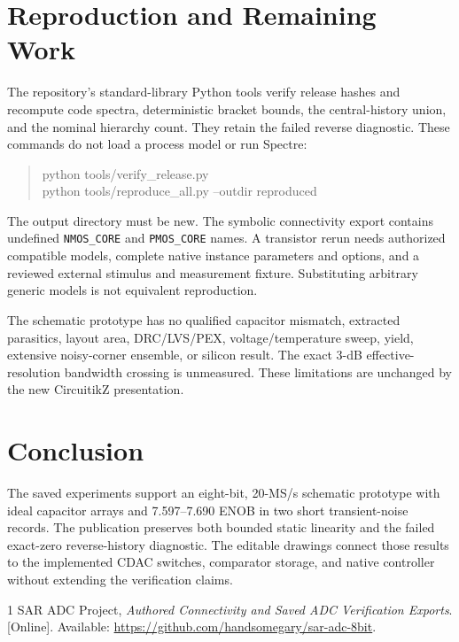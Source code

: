 \documentclass[10pt,conference,letterpaper]{IEEEtran}
\begin{document}
\section{Reproduction and Remaining Work}
The repository's standard-library Python tools verify release hashes and recompute code spectra, deterministic bracket bounds, the central-history union, and the nominal hierarchy count. They retain the failed reverse diagnostic. These commands do not load a process model or run Spectre:
\begin{quote}\small\ttfamily
python tools/verify\_release.py\\
python tools/reproduce\_all.py --outdir reproduced
\end{quote}
The output directory must be new. The symbolic connectivity export contains undefined \texttt{NMOS\_CORE} and \texttt{PMOS\_CORE} names. A transistor rerun needs authorized compatible models, complete native instance parameters and options, and a reviewed external stimulus and measurement fixture. Substituting arbitrary generic models is not equivalent reproduction.

The schematic prototype has no qualified capacitor mismatch, extracted parasitics, layout area, DRC/LVS/PEX, voltage/temperature sweep, yield, extensive noisy-corner ensemble, or silicon result. The exact 3-dB effective-resolution bandwidth crossing is unmeasured. These limitations are unchanged by the new CircuitikZ presentation.

\section{Conclusion}
The saved experiments support an eight-bit, 20-MS/s schematic prototype with ideal capacitor arrays and 7.597--7.690 ENOB in two short transient-noise records. The publication preserves both bounded static linearity and the failed exact-zero reverse-history diagnostic. The editable drawings connect those results to the implemented CDAC switches, comparator storage, and native controller without extending the verification claims.

\begin{thebibliography}{1}
 SAR ADC Project, \emph{Authored Connectivity and Saved ADC Verification Exports}. [Online]. Available: \url{https://github.com/handsomegary/sar-adc-8bit}.
\end{thebibliography}
\end{document}
